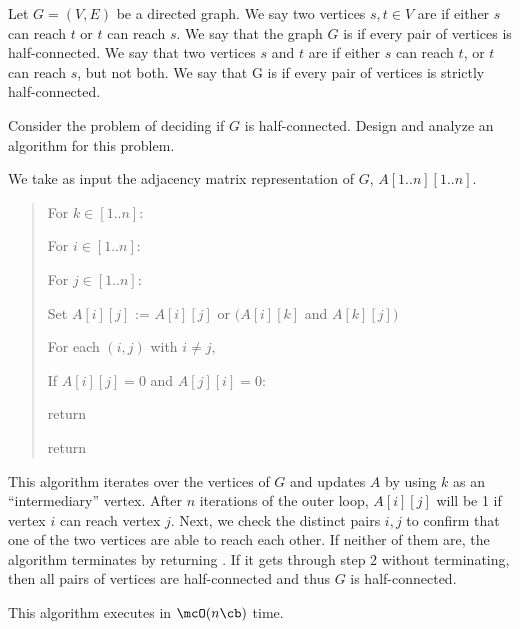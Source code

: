 \documentclass{article}
\begin{document}
 Let $G = (V, E)$ be a directed graph. We say two vertices $s, t \in V$ are  if either $s$ can reach $t$ or $t$ can reach $s$.
We say that the graph $G$ is  if every pair of vertices is half-connected.
We say that two vertices $s$ and $t$ are  if either $s$ can reach $t$, or $t$ can reach $s$, but not both.
We say that G is  if every pair of vertices is strictly half-connected.
\setcounter{section}{6}
\setcounter{exercise}{5}
\begin{subexercise}
Consider the problem of deciding if $G$ is half-connected.
Design and analyze an algorithm for this problem.
\end{subexercise}

\begin{solution}
We take as input the adjacency matrix representation of $ G $, $ A[1..n][1..n] $.
\begin{quote}
\begin{steps}
  \item For $ k\in [1..n] $: \begin{steps}
    \item For $ i\in [1..n] $: \begin{steps}
      \item For $ j\in [1..n] $: \begin{steps}
        \item Set $ A[i][j] $ := $ A[i][j] $ or $ (A[i][k] $ and $ A[k][j]) $
      \end{steps}
    \end{steps}
  \end{steps}
  \item For each $ (i,j) $ with $ i\neq j $, \begin{steps}
    \item If $ A[i][j] = 0 $ and $ A[j][i] = 0 $: \begin{steps}
      \item return \boolF
    \end{steps}
  \end{steps}
  \item return \boolT
\end{steps}
\end{quote}
This algorithm iterates over the vertices of $ G $ and updates $ A $ by using $ k $ as an ``intermediary'' vertex.
After $ n $ iterations of the outer loop, $ A[i][j] $ will be 1 if vertex $ i $ can reach vertex $ j $.
Next, we check the distinct pairs $ i,j $ to confirm that one of the two vertices are able to reach each other.
If neither of them are, the algorithm terminates by returning \boolF.
If it gets through step 2 without terminating, then all pairs of vertices are half-connected and thus $ G $ is half-connected.

This algorithm executes in $ \mcO(n\cb) $ time.
\end{solution}
\pagebreak
\end{document}
